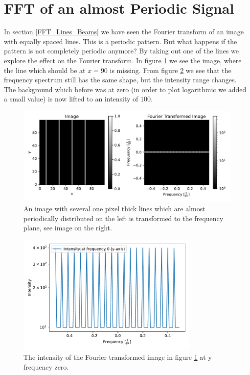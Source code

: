 \section{FFT of an almost Periodic Signal}
\label{almostPeriod} 
In section \ref{FFT_Lines_Beams} we have seen the Fourier transform of an image with equally spaced lines. This is a periodic pattern. But what happens if the pattern is not completely periodic anymore? By taking out one of the lines we explore the effect on the Fourier transform. In figure \ref{fig:fft_lines_almostper} we see the image, where the line which should be at $x=90$ is missing. From figure \ref{fig:fft_lines_cut_almostper} we see that the frequency spectrum still has the same shape, but the intensity range changes. The background which before was at zero (in order to plot logarithmic we added a small value) is now lifted to an intensity of $100$. 
\begin{figure}[H]
	\centering
		\includegraphics[width=1.0\textwidth]{pics/fft_simulationmorelines_almostper.pdf}
		\caption{An image with several one pixel thick lines which are almost periodically distributed on the left is transformed to the frequency plane, see image on the right.}
		\label{fig:fft_lines_almostper}
\end{figure}
\begin{figure}[H]
	\centering
		\includegraphics[width=0.8\textwidth]{pics/fft_simulation_cutmorelines_almostper.pdf}
		\caption{The intensity of the Fourier transformed image in figure \ref{fig:fft_lines_almostper} at y frequency zero.}
		\label{fig:fft_lines_cut_almostper}
\end{figure}